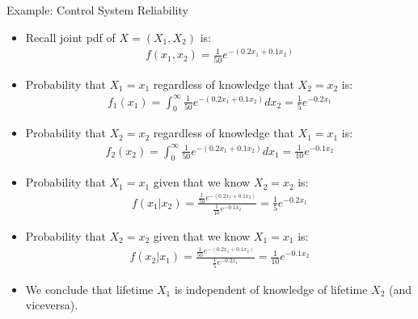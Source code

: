 \documentclass[handout,9pt]{beamer}
\begin{document}
%
\begin{frame}{Example: Control System Reliability}

\begin{itemize}
\setlength{\itemsep}{5pt}
\item Recall joint pdf of $X=(X_1,X_2)$ is:
\begin{align*}
f(x_1,x_2)=\frac{1}{50}e^{-(0.2x_1+0.1x_2)}
\end{align*} 
\item Probability that $X_1=x_1$ regardless of knowledge that $X_2=x_2$ is:
\begin{align*}
f_1(x_1)=\int_{0}^{\infty}\frac{1}{50}e^{-(0.2x_1+0.1x_2)}dx_2=\frac{1}{5}e^{-0.2x_1}
\end{align*} 
\item Probability that $X_2=x_2$ regardless of knowledge that $X_1=x_1$ is:
\begin{align*}
f_2(x_2)=\int_{0}^{\infty}\frac{1}{50}e^{-(0.2x_1+0.1x_2)}dx_1=\frac{1}{10}e^{-0.1x_2}
\end{align*} 
\item Probability that $X_1=x_1$ given that we know $X_2=x_2$ is:
\begin{align*}
f(x_1|x_2)=\frac{\frac{1}{50}e^{-(0.2x_1+0.1x_2)}}{\frac{1}{10}e^{-0.1x_2}}=\frac{1}{5}e^{-0.2x_1}
\end{align*}
\item Probability that $X_2=x_2$ given that we know $X_1=x_1$ is:
\begin{align*}
f(x_2|x_1)=\frac{\frac{1}{50}e^{-(0.2x_1+0.1x_2)}}{\frac{1}{5}e^{-0.2x_1}}=\frac{1}{10}e^{-0.1x_2}
\end{align*}
\item We conclude that lifetime $X_1$ is independent of knowledge of lifetime $X_2$ (and viceversa). 
\end{itemize}

\end{frame}
\end{document}
